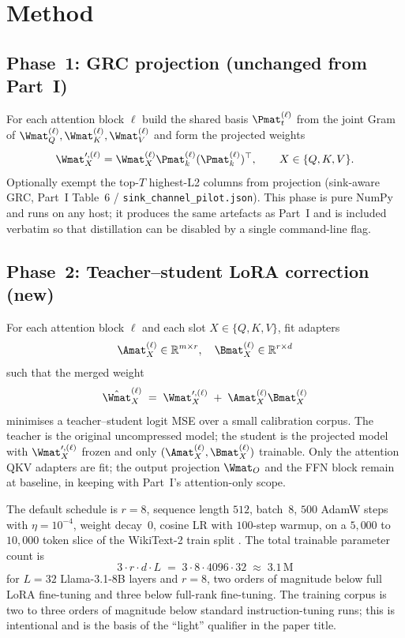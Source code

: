 \documentclass[11pt]{article}
\begin{document}
\section{Method}
\label{sec:method}

\subsection{Phase~1: GRC projection (unchanged from Part~I)}
\label{sec:phase1}
For each attention block $\ell$ build the shared basis $\Pmat_t^{(\ell)}$
from the joint Gram of $\Wmat_Q^{(\ell)}, \Wmat_K^{(\ell)}, \Wmat_V^{(\ell)}$
and form the projected weights
\[
\Wmat_X^{\prime,(\ell)} = \Wmat_X^{(\ell)} \Pmat_k^{(\ell)} (\Pmat_k^{(\ell)})^\top,
\qquad X \in \{Q,K,V\}.
\]
Optionally exempt the top-$T$ highest-L2 columns from projection
(sink-aware GRC, Part~I Table~6 / \texttt{sink\_channel\_pilot.json}).
This phase is pure NumPy and runs on any host; it produces the same
artefacts as Part~I and is included verbatim so that distillation can
be disabled by a single command-line flag.

\subsection{Phase~2: Teacher--student LoRA correction (new)}
\label{sec:phase2}
For each attention block $\ell$ and each slot $X \in \{Q,K,V\}$, fit
adapters
\[
\Amat_X^{(\ell)} \in \mathbb{R}^{m \times r},\quad
\Bmat_X^{(\ell)} \in \mathbb{R}^{r \times d}
\]
such that the merged weight
\[
\hat{\Wmat}_X^{(\ell)} \;=\; \Wmat_X^{\prime,(\ell)} \;+\; \Amat_X^{(\ell)} \Bmat_X^{(\ell)}
\]
minimises a teacher--student logit MSE over a small calibration corpus.
The teacher is the original uncompressed model; the student is the
projected model with $\Wmat_X^{\prime,(\ell)}$ frozen and only
$(\Amat_X^{(\ell)}, \Bmat_X^{(\ell)})$ trainable. Only the attention QKV
adapters are fit; the output projection $\Wmat_O$ and the FFN block
remain at baseline, in keeping with Part~I's attention-only scope.

The default schedule is $r{=}8$, sequence length $512$, batch~$8$,
$500$ AdamW steps with $\eta{=}10^{-4}$, weight decay~$0$, cosine LR
with $100$-step warmup, on a $5{,}000$ to $10{,}000$ token slice of
the WikiText-2 train split \cite{merity2016wikitext}. The total
trainable parameter count is
\[
3 \cdot r \cdot d \cdot L \;=\; 3 \cdot 8 \cdot 4096 \cdot 32 \;\approx\; 3.1\,\mathrm{M}
\]
for $L{=}32$ Llama-3.1-8B layers and $r{=}8$, two orders of magnitude
below full LoRA fine-tuning and three below full-rank fine-tuning. The
training corpus is two to three orders of magnitude below standard
instruction-tuning runs; this is intentional and is the basis of the
``light'' qualifier in the paper title.
\end{document}
